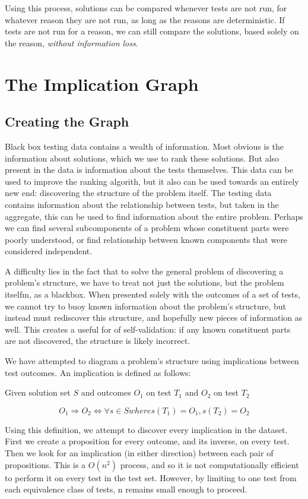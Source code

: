 \documentclass[11pt]{article}
\begin{document}
Using this process, solutions can be compared whenever tests are not run, for whatever reason they are not run, as long as the reasons are deterministic. If tests are not run for a reason, we can still compare the solutions, based solely on the reason, \emph{without information loss}.

\section{The Implication Graph}
\subsection{Creating the Graph}
Black box testing data contains a wealth of information. Most obvious is the information about solutions, which we use to rank these solutions. But also present in the data is information about the tests themselves. This data can be used to improve the ranking algorith, but it also can be used towards an entirely new end: discovering the structure of the problem itself. The testing data contains information about the relationship between tests, but taken in the aggregate, this can be used to find information about the entire problem. Perhaps we can find several subcomponents of a problem whose constituent parts were poorly understood, or find relationship between known components that were considered independent.

A difficulty lies in the fact that to solve the general problem of discovering a problem's structure, we have to treat not just the solutions, but the problem itselfm, as a blackbox. When presented solely with the outcomes of a set of tests, we cannot try to buoy known information about the problem's structure, but instead must rediscover this structure, and hopefully new pieces of information as well. This creates a useful for of self-validation: if any known constituent parts are not discovered, the structure is likely incorrect.

We have attempted to diagram a problem's structure using implications between test outcomes. An implication is defined as follows:

\centerline{Given solution set $S$ and outcomes $O_1$ on test $T_1$ and $O_2$ on test $T_2$}
$$O_1 \Rightarrow O_2 \iff \forall s \in S where s(T_1) = O_1, s(T_2) = O_2$$

Using this definition, we attempt to discover every implication in the dataset. First we create a proposition for every outcome, and its inverse, on every test. Then we look for an implication (in either direction) between each pair of propositions. This is a $O(n^2)$ process, and so it is not computationally efficient to perform it on every test in the test set. However, by limiting to one test from each equivalence class of tests, n remains small enough to proceed.
\end{document}

